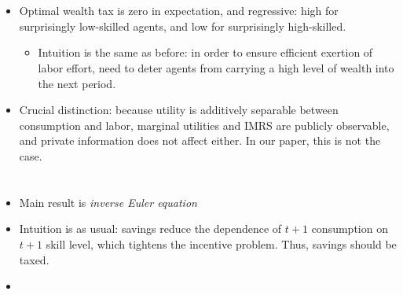 \documentclass[11pt]{article}
\begin{document}
\section{\cite{kocherlakota2005zero}}
\begin{itemize}
    \item Optimal wealth tax is zero in expectation, and regressive: high for surprisingly low-skilled agents, and low for surprisingly high-skilled. 
    \begin{itemize}
        \item Intuition is the same as before: in order to ensure efficient exertion of labor effort, need to deter agents from carrying a high level of wealth into the next period. 
    \end{itemize}
    \item Crucial distinction: because utility is additively separable between consumption and labor, marginal utilities and IMRS are publicly observable, and private information does not affect either. In our paper, this is not the case. 
\end{itemize}

\section{\cite{golosov2003optimal}} \label{sec:golosov03}
\begin{itemize}
    \item Main result is \textit{inverse Euler equation}
    \item Intuition is as usual: savings reduce the dependence of \( t+1 \) consumption on \( t+1 \) skill level, which tightens the incentive problem. Thus, savings should be taxed.
    \item 
\end{itemize}
\end{document}

